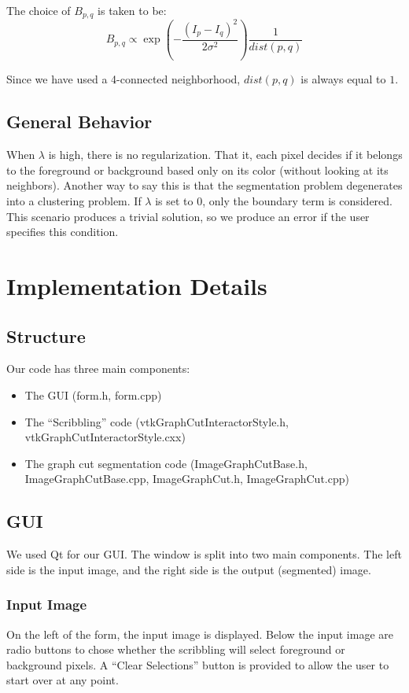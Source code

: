 \documentclass{InsightArticle}
\begin{document}
The choice of $B_{p,q}$ is taken to be:
\begin{equation}
 B_{p,q} \propto \exp\left(-\frac{(I_p - I_q)^2}{2\sigma^2}\right) \frac{1}{dist(p,q)}
\end{equation}

Since we have used a 4-connected neighborhood, $dist(p,q)$ is always equal to $1$.

\subsection{General Behavior}
When $\lambda$ is high, there is no regularization. That it, each pixel decides if it belongs to the foreground or background based only on its color (without looking at its neighbors). Another way to say this is that the segmentation problem degenerates into a clustering problem. If $\lambda$ is set to $0$, only the boundary term is considered. This scenario produces a trivial solution, so we produce an error if the user specifies this condition.

\section{Implementation Details}
\subsection{Structure}
Our code has three main components: 
\begin{itemize}
\item The GUI (form.h, form.cpp)
\item The ``Scribbling'' code (vtkGraphCutInteractorStyle.h, vtkGraphCutInteractorStyle.cxx)
\item The graph cut segmentation code (ImageGraphCutBase.h, ImageGraphCutBase.cpp, ImageGraphCut.h, ImageGraphCut.cpp)
\end{itemize}
 
\subsection{GUI}
\label{subsec:GUI}
We used Qt for our GUI. The window is split into two main components. The left side is the input image, and the right side is the output (segmented) image.
\subsubsection{Input Image}
On the left of the form, the input image is displayed. Below the input image are radio buttons to chose whether the scribbling will select foreground or background pixels. A ``Clear Selections'' button is provided to allow the user to start over at any point.
\end{document}
